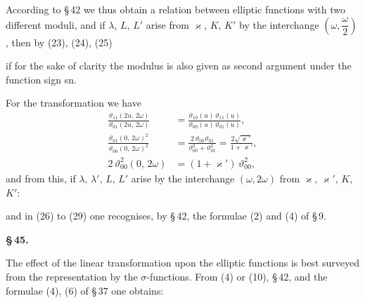

According to \S\,42 we thus obtain a relation between elliptic functions with two different moduli, and if $\lambda$, $L$, $L'$ arise from $\varkappa$, $K$, $K'$ by the interchange $\left(\omega,\dfrac{\omega}{2}\right)$, then by (23), (24), (25)



if for the sake of clarity the modulus is also given as second argument under the function sign sn.

For the  transformation we have
\[
\begin{aligned}
\frac{\vartheta_{11}(2u,\,2\omega)}{\vartheta_{01}(2u,\,2\omega)}&=\frac{\vartheta_{10}(u)\,\vartheta_{11}(u)}{\vartheta_{00}(u)\,\vartheta_{01}(u)},\\[4pt]
\frac{\vartheta_{01}(0,\,2\omega)^{2}}{\vartheta_{00}(0,\,2\omega)^{2}}&=\frac{2\,\vartheta_{00}\vartheta_{01}}{\vartheta_{00}^{2}+\vartheta_{01}^{2}}=\frac{2\sqrt{\varkappa'}}{1+\varkappa'},\\[4pt]
2\,\vartheta_{00}^{2}(0,\,2\omega)&=(1+\varkappa')\,\vartheta_{00}^{2},
\end{aligned}
\]
and from this, if $\lambda$, $\lambda'$, $L$, $L'$ arise by the interchange $(\omega,2\omega)$ from $\varkappa$, $\varkappa'$, $K$, $K'$:



and in (26) to (29) one recognises, by \S\,42, the formulae (2) and (4) of \S\,9.

\begin{center}
\textbf{\S\,45. }
\end{center}

The effect of the linear transformation upon the elliptic functions is best surveyed from the representation by the $\sigma$-functions. From (4) or (10), \S\,42, and the formulae (4), (6) of \S\,37 one obtains:
